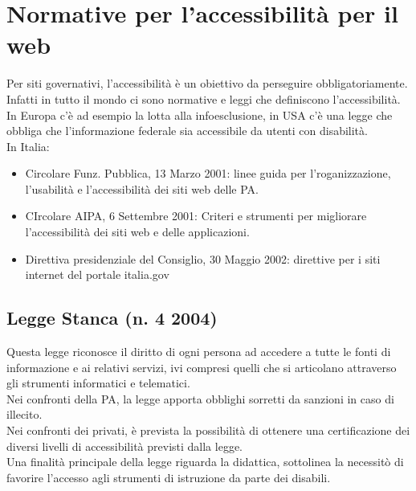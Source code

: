 \documentclass{article}
\begin{document}
\section{Normative per l'accessibilità per il web}
Per siti governativi, l'accessibilità è un obiettivo da perseguire obbligatoriamente.\\
Infatti in tutto il mondo ci sono normative e leggi che definiscono l'accessibilità.
In Europa c'è ad esempio la lotta alla infoesclusione, in USA c'è una legge che obbliga che l'informazione federale sia accessibile da utenti con disabilità.\\
In Italia:
\begin{itemize}
	\item Circolare Funz. Pubblica, 13 Marzo 2001: linee guida per l'roganizzazione, l'usabilità e l'accessibilità dei siti web delle PA.
	\item CIrcolare AIPA, 6 Settembre 2001: Criteri e strumenti per migliorare l'accessibilità dei siti web e delle applicazioni.
	\item Direttiva presidenziale del Consiglio, 30 Maggio 2002: direttive per i siti internet del portale italia.gov
\end{itemize}
\subsection{Legge Stanca (n. 4 2004)}
Questa legge riconosce il diritto di ogni persona ad accedere a tutte le fonti di informazione e ai relativi servizi, ivi compresi quelli che si articolano attraverso gli strumenti informatici e telematici.\\
Nei confronti della PA, la legge apporta obblighi sorretti da sanzioni in caso di illecito.\\
Nei confronti dei privati, è prevista la possibilità di ottenere una certificazione dei diversi livelli di accessibilità previsti dalla legge.\\
Una finalità principale della legge riguarda la didattica, sottolinea la necessitò di favorire l'accesso agli strumenti di istruzione da parte dei disabili.
\end{document}
